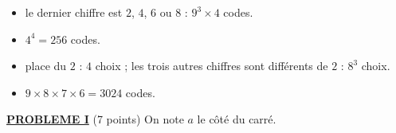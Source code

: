 \begin{description}
\begin{enumerate}
		\begin{itemize}
			\item {}
				le dernier chiffre est $2$, $4$, $6$ ou $8$ : $9^3 \times 4$ codes. \par\noindent{}
			\item {}
				$4^4 = 256$ codes. \par\noindent{}
			\item {}
				place du $2$ : $4$ choix ; les trois autres chiffres sont différents de $2$ : $8^3$ choix. \par\noindent{}
			\item {}
				$9 \times 8 \times 7 \times 6 = 3024$ codes. \par\noindent{}
		\end{itemize}
	\end{enumerate}
\end{description}
\noindent \underline{\textsc{\textbf{PROBLEME I}}} (7 points) \newline
On note $a$ le côté du carré.
